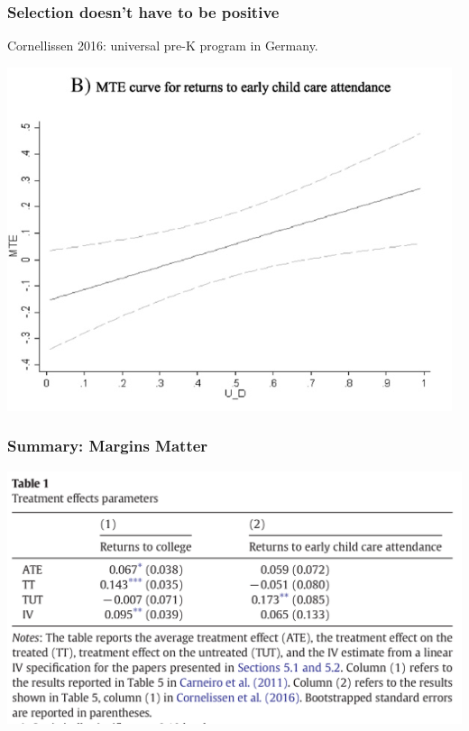 \begin{frame}
  \frametitle{Selection doesn't have to be positive}
  Cornellissen 2016: universal pre-K program in Germany. 
  \begin{center}
    \includegraphics[width= .9\textwidth]{./resources/CornelissenNegative}
   \end{center}
    
\end{frame}

\begin{frame}
  \frametitle{Summary: Margins Matter}
  \begin{center}
    \includegraphics[width= \textwidth]{./resources/CornelissenSummary}
   \end{center}
\end{frame}

